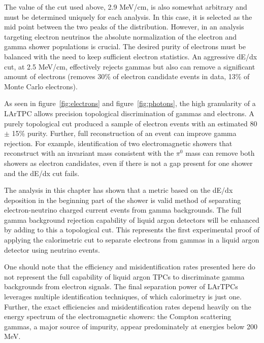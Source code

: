 The value of the cut used above, 2.9 MeV/cm, is also somewhat arbitrary and must be determined uniquely for each analysis.  In this case, it is selected as the mid point between the two peaks of the distribution.  However, in an analysis targeting electron neutrinos the absolute normalization of the electron and gamma shower populations is crucial.  The desired purity of electrons must be balanced with the need to keep sufficient electron statistics.  An aggressive dE/dx cut, at 2.5 MeV/cm, effectively rejects gammas but also can remove a significant amount of electrons (removes 30\% of electron candidate events in data, 13\% of Monte Carlo electrons).  


As seen in figure~\ref{fig:electrons} and figure~\ref{fig:photons}, the high granularity of a LArTPC allows precision topological discrimination of gammas and electrons.  A purely topological cut produced a sample of electron events with an estimated 80 $\pm$ 15\% purity.  Further, full reconstruction of an event can improve gamma rejection.  For example, identification of two electromagnetic showers that reconstruct with an invariant mass consistent with the $\pi^0$ mass can remove both showers as electron candidates, even if there is not a gap present for one shower and the dE/dx cut fails.

The analysis in this chapter has shown that a metric based on the dE/dx deposition in the beginning part of the shower is valid method of separating electron-neutrino charged current events from gamma backgrounds. The full gamma background rejection capability of liquid argon detectors will be enhanced by adding to this a topological cut. This represents the first experimental proof of applying the calorimetric cut to separate electrons from gammas in a liquid argon detector using neutrino events.

One should note that the efficiency and misidentification rates presented here do not represent the full capability of liquid argon TPCs to discriminate gamma backgrounds from electron signals. The final separation power of LArTPCs leverages multiple identification techniques, of which calorimetry is just one.  Further, the exact efficiencies and misidentification rates depend heavily on the energy spectrum of the electromagnetic showers: the Compton scattering gammas, a major source of impurity, appear predominately at energies below 200 MeV.
